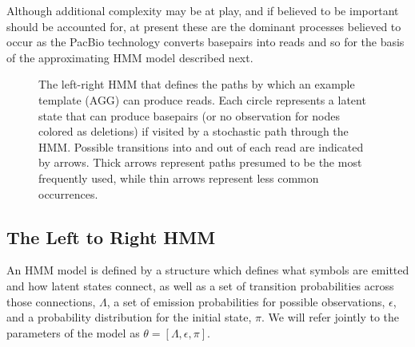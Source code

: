 \documentclass[fleqn,10pt]{SelfArx} %
\begin{document}
Although additional complexity may be at play, and if believed to be important should be accounted for, at present these are the dominant processes believed to occur as the PacBio technology converts basepairs into reads and so for the basis of the approximating HMM model described next.

\begin{figure}[ht] %
		\caption{The left-right HMM that defines the paths by which an example template (AGG) can produce reads.  Each circle represents a latent state that can produce basepairs (or no observation for nodes colored as deletions) if visited by a stochastic path through the HMM.  Possible transitions into and out of each read are indicated by arrows.  Thick arrows represent paths presumed to be the most frequently used, while thin arrows represent less common occurrences. }				
\end{figure}

\subsection{The Left to Right HMM}
An HMM model is defined by a structure which defines what symbols are emitted and how latent states connect, as well as a set of transition probabilities across those connections, $\Lambda$, a set of emission probabilities for possible observations, $\epsilon$, and a probability distribution for the initial state, $\pi$.   We will refer jointly to the parameters of the model as $\theta = [\Lambda, \epsilon, \pi]$.
\end{document}
